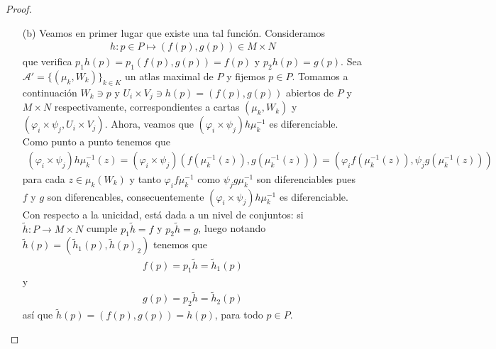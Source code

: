 \documentclass[11pt]{article}
\begin{document}
\begin{proof}
\begin{itemize}
\item[(b)] Veamos en primer lugar que existe una tal funci\'on. Consideramos 
\begin{align*}
h : p \in P \mapsto (f(p),g(p)) \in M \times N
\end{align*}
que verifica $p_1h(p) = p_1(f(p), g(p)) = f(p)$ y $p_2h(p) = g(p)$. Sea $\mathcal{A}' = \{(\mu_k,W_k)\}_{k \in K}$ un atlas maximal de $P$ y fijemos $p \in P$. Tomamos a continuaci\'on $W_k \ni p$ y $U_i \times V_j \ni h(p) = (f(p),g(p))$ abiertos de $P$ y $M \times N$ respectivamente, correspondientes a cartas $(\mu_k,W_k)$ y $(\varphi_i \times \psi_j, U_i \times V_j)$. Ahora, veamos que $(\varphi_i \times \psi_j)h \mu_k^{-1}$ es diferenciable. Como punto a punto tenemos que
\begin{align*}
(\varphi_i \times \psi_j)h \mu_k^{-1}(z) = (\varphi_i \times \psi_j)(f(\mu_k^{-1}(z)) , g(\mu_k^{-1}(z))) = (\varphi_i f(\mu_k^{-1}(z)),\psi_j g(\mu_k^{-1}(z)))
\end{align*}
para cada $z \in \mu_k(W_k)$ y tanto $\varphi_if\mu_k^{-1}$ como $\psi_jg\mu_k^{-1}$ son diferenciables pues $f$ y $g$ son diferencables, consecuentemente $(\varphi_i \times \psi_j)h \mu_k^{-1}$ es diferenciable. Con respecto a la unicidad, est\'a dada a un nivel de conjuntos: si $\tilde{h} : P \to M \times N$ cumple $p_1\tilde{h} = f$ y $p_2\tilde{h} = g$, luego notando $\tilde{h}(p) = (\tilde{h}_1(p), \tilde{h}(p)_2)$ tenemos que 
\begin{align*}
f(p) = p_1\tilde{h} = \tilde{h}_1(p)
\end{align*}
y
\begin{align*}
g(p) = p_2\tilde{h} = \tilde{h}_2(p)
\end{align*}
as\'i que $\tilde{h}(p) = (f(p),g(p)) = h(p)$, para todo $p \in P$.
\begin{center}
\end{center}
\end{itemize}
\end{proof}
\end{document}
